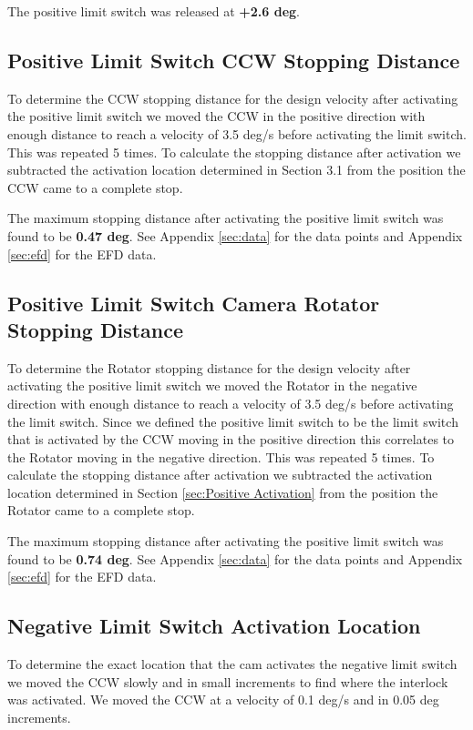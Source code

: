 \documentclass[SE,authoryear,toc, lsstdraft]{lsstdoc}
\begin{document}
The positive limit switch was released at \textbf{+2.6 deg}.

\subsection{Positive Limit Switch CCW Stopping Distance}

To determine the CCW stopping distance for the design velocity after
activating the positive limit switch we moved the CCW in the positive
direction with enough distance to reach a velocity of 3.5 deg/s before
activating the limit switch. This was repeated 5 times. To
calculate the stopping distance after activation we subtracted the
activation location determined in Section 3.1 from the position the CCW
came to a complete stop.

The maximum stopping distance after activating the positive limit switch
was found to be \textbf{0.47 deg}. See Appendix \ref{sec:data} for the data points
and Appendix \ref{sec:efd} for the EFD data.

\subsection{Positive Limit Switch Camera Rotator Stopping Distance}

To determine the Rotator stopping distance for the design velocity after
activating the positive limit switch we moved the Rotator in the
negative direction with enough distance to reach a velocity of 3.5 deg/s
before activating the limit switch. Since we defined the positive limit
switch to be the limit switch that is activated by the CCW moving in the
positive direction this correlates to the Rotator moving in the negative
direction. This was repeated 5 times. To calculate the stopping
distance after activation we subtracted the activation location
determined in Section \ref{sec:Positive Activation} from the position the Rotator came to a
complete stop.

The maximum stopping distance after activating the positive limit switch
was found to be \textbf{0.74 deg}. See Appendix \ref{sec:data} for the data points
and Appendix \ref{sec:efd} for the EFD data.

\subsection{Negative Limit Switch Activation Location}\label{sec:Negative Activation}

To determine the exact location that the cam activates the negative
limit switch we moved the CCW slowly and in small increments to find
where the interlock was activated. We moved the CCW at a velocity of 0.1
deg/s and in 0.05 deg increments.
\end{document}
